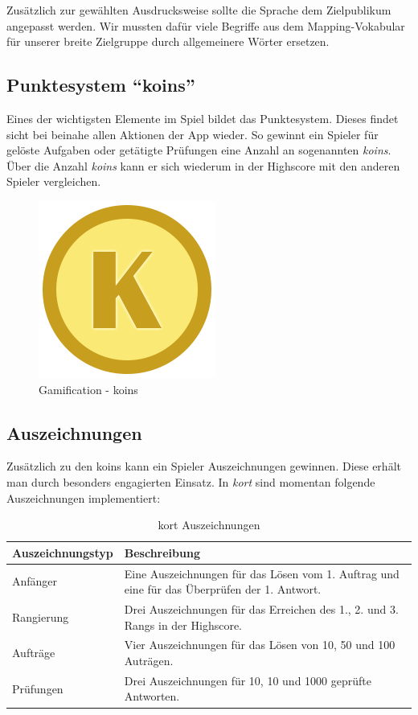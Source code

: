 Zusätzlich zur gewählten Ausdrucksweise sollte die Sprache dem Zielpublikum angepasst werden.
Wir mussten dafür viele Begriffe aus dem Mapping-Vokabular für unserer breite Zielgruppe durch allgemeinere Wörter ersetzen.

\subsection{Punktesystem "`koins"'}
Eines der wichtigsten Elemente im Spiel bildet das Punktesystem. Dieses findet sicht bei beinahe allen Aktionen der App wieder. So gewinnt ein Spieler für gelöste Aufgaben oder getätigte Prüfungen eine Anzahl an sogenannten \emph{koins}. Über die Anzahl \emph{koins} kann er sich wiederum in der Highscore mit den anderen Spieler vergleichen.

\begin{figure}[H]
	\centering
	\includegraphics[scale=0.4]{images/gamification/gamification-koin}
	\caption{Gamification - koins}
	\label{gamification-koins}
\end{figure}

\subsection{Auszeichnungen}
Zusätzlich zu den koins kann ein Spieler Auszeichnungen gewinnen. Diese erhält man durch besonders engagierten Einsatz. In \emph{kort} sind momentan folgende Auszeichnungen implementiert:

\begin{table}[H]
\centering
\begin{tabular}{|p{0.3\twocelltabwidth}|p{0.7\twocelltabwidth}|}
\hline 
\textbf{Auszeichnungstyp} & \textbf{Beschreibung} \\ 
\hline 
Anfänger & Eine Auszeichnungen für das Lösen vom 1. Auftrag und eine für das Überprüfen der 1. Antwort. \\ 
\hline 
Rangierung & Drei Auszeichnungen für das Erreichen des 1., 2. und 3. Rangs in der Highscore. \\ 
\hline 
Aufträge & Vier Auszeichnungen für das Lösen von 10, 50 und 100 Auträgen. \\ 
\hline 
Prüfungen & Drei Auszeichnungen für 10, 10 und 1000 geprüfte Antworten. \\ 
\hline 
\end{tabular} 
\caption{kort Auszeichnungen}
\label{kort-badges}
\end{table}

